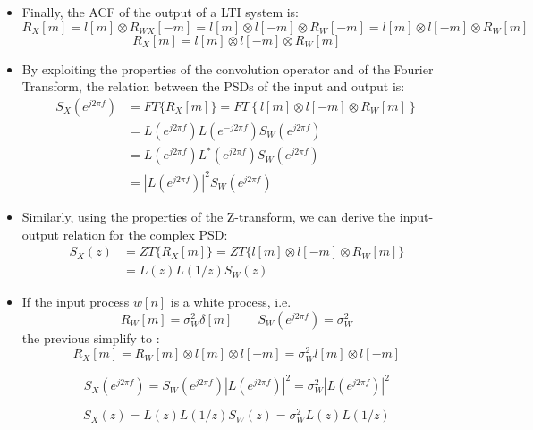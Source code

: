 \begin{itemize}
\[\begin{aligned}
= \sum_{k=-\infty}^{+\infty} l[k] R_W[m-k] \\
&= l[m] \otimes R_W[m]
\end{aligned}
\]
\item Finally, the ACF of the output of a LTI system is:
\[
R_X[m] = l[m] \otimes R_{WX}[-m] = l[m] \otimes l[-m] \otimes R_W[-m] = l[m] \otimes l[-m] \otimes R_W[m]
\]
\[
R_X[m] = l[m] \otimes l[-m] \otimes R_W[m]
\]
\item By exploiting the properties of the convolution operator and of the Fourier Transform, the relation between the PSDs of the input and output is:
\[
\begin{aligned}
S_X \left( e^{j2\pi f} \right) &= FT\{R_X[m]\} = FT\left\{ l[m] \otimes l[-m] \otimes R_W[m] \right\} \\
&= L\left(e^{j2\pi f}\right) L\left(e^{-j2\pi f}\right) S_W\left(e^{j2\pi f}\right) \\
&= L\left(e^{j2\pi f}\right) L^*\left(e^{j2\pi f}\right) S_W\left(e^{j2\pi f}\right) \\
&= \left|L\left(e^{j2\pi f}\right)\right|^2 S_W\left(e^{j2\pi f}\right)
\end{aligned}
\]
\item Similarly, using the properties of the Z-transform, we can derive the input-output relation for the complex PSD:
\[
\begin{aligned}
S_X(z) &= ZT\{R_X[m]\} = ZT\{l[m] \otimes l[-m] \otimes R_W[m]\} \\
&= L(z) L(1/z) S_W(z)
\end{aligned}
\]
\item If the input process \(w[n]\) is a white process, i.e.
\[
R_W[m]=\sigma_W^2\delta[m]\qquad S_W(e^{j2\pi f})=\sigma_W^2
\]
the previous simplify to :
\[
R_X[m] = R_W[m] \otimes l[m] \otimes l[-m] = \sigma_W^2 l[m] \otimes l[-m]
\]

\[
S_X\left(e^{j2\pi f}\right) = S_W\left(e^{j2\pi f}\right) \left|L\left(e^{j2\pi f}\right)\right|^2 = \sigma_W^2 \left|L\left(e^{j2\pi f}\right)\right|^2
\]

\[
S_X(z) = L(z) L(1/z) S_W(z) = \sigma_W^2 L(z) L(1/z)
\]

\end{itemize}
